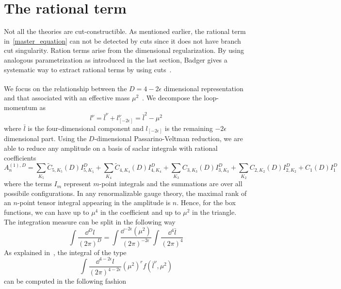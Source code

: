 \section{The rational term}
Not all the theories are cut-constructible. 
As mentioned earlier, the rational term in~\cref{master_equation} can not be detected by cuts since it does not have branch cut singularity. 
Ration terms arise from the dimensional regularization.
By using analogous parametrization as introduced in the last section, 
Badger gives a systematic way to extract rational terms by using cuts~\cite{Badger:2008cm}.
\\\\
We focus on the relationship between the $D = 4-2\epsilon$ dimensional representation and that associated with an effective mass $\mu^2$~\cite{Mahlon:1993si}.
We decompose the loop-momentum as
\begin{equation*}
l^\nu = \bar{l}^\nu + l_{[-2\epsilon]}^\nu = \bar{l}^2 - \mu^2
\end{equation*}
where $\bar{l}$ is the four-dimensional component and $l_{[-2\epsilon]}$ is the remaining $-2\epsilon$ dimensional part.
Using the $D$-dimensional Passarino-Veltman reduction, we are able to reduce any amplitude on a basis of saclar integrals with rational coefficients
\begin{equation*}
A_n^{(1),D} = \sum_{K_5} \tilde{C}_{5,K_5}(D) I^D_{5,K_5}
+\sum_{K_4} \tilde{C}_{4,K_4}(D) I^D_{4,K_4}
+\sum_{K_3} C_{3,K_3}(D) I^D_{3,K_3}
+\sum_{K_2} C_{2,K_2}(D) I^D_{2,K_2}
+C_1(D)I_1^D
\end{equation*}
where the terms $I_m$ represent $m$-point integrals and the summations are over all possibile configurations.
In any renormalizable gauge theory, the maximal rank of an $n$-point tensor integral appearing in the amplitude is $n$.
Hence, for the box functions, we can have up to $\mu^4$ in the coefficient and up to $\mu^2$ in the triangle.
\\
The integration measure can be split in the following way
\begin{equation*}
\int\frac{\dd^D l}{(2\pi)^D} = 
\int\frac{\dd^{-2\epsilon}(\mu^2)}{(2\pi)^{-2\epsilon}}\int\frac{\dd^4 \bar{l}}{(2\pi)^4}
\end{equation*}
As explained in~\cite{Bern:1995db}, the integral of the type
\begin{equation*}
\int\frac{\dd^{4-2\epsilon} l}{(2\pi)^{4-2\epsilon}} (\mu^2)^rf(
\bar{l}^\nu,\mu^2) 
\end{equation*}
can be computed in the following fashion
